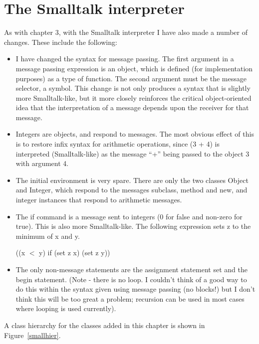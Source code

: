 \chapter{The Smalltalk interpreter}

As with chapter 3, with the Smalltalk interpreter I have also made a number of
changes.  These include the following:

\begin{itemize}
    \item I have changed the syntax for message passing.  The first argument in
    a message passing expression is an object, which is defined (for
    implementation purposes) as a type of function.  The second argument must be
    the message selector, a symbol.  This change is not only produces a syntax
    that is slightly more Smalltalk-like, but it more closely reinforces the
    critical object-oriented idea that the interpretation of a message depends
    upon the receiver for that message.
    \item Integers are objects, and respond to messages.  The most obvious
    effect of this is to restore infix syntax for arithmetic operations, since
    (3 + 4) is interpreted (Smalltalk-like) as the message ``+'' being passed to
    the object 3 with argument 4.
    \item The initial environment is very spare.  There are only the two classes
    {\sf Object} and {\sf Integer}, which respond to the messages {\sf
        subclass}, {\sf method} and {\sf new}, and integer instances that
    respond to arithmetic messages.
    \item The {\sf if} command is a message sent to integers (0 for false and
    non-zero for true).  This is also more Smalltalk-like.  The following
    expression sets {\sf z} to the minimum of {\sf x} and {\sf y}.
    \begin{center} {\sf ((x $<$ y) if (set z x) (set z y))}
    \end{center}
    \item The only non-message statements are the assignment statement {\sf set}
    and the {\sf begin} statement.  (Note - there is no loop.  I couldn't think
    of a good way to do this within the syntax given using message passing (no
    blocks!) but I don't think this will be too great a problem; recursion can
    be used in most cases where looping is used currently).
\end{itemize}

A class hierarchy for the classes added in this chapter is shown in
Figure~\ref{smallhier}.

